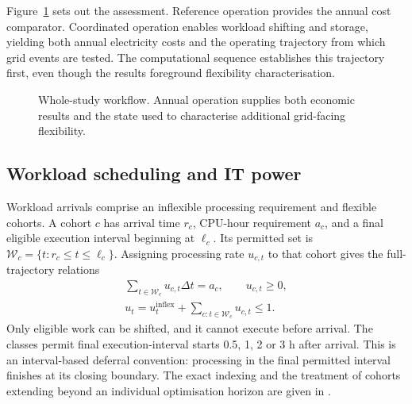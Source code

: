 Figure~\ref{fig:workflow} sets out the assessment. Reference operation provides the annual cost comparator. Coordinated operation enables workload shifting and storage, yielding both annual electricity costs and the operating trajectory from which grid events are tested. The computational sequence establishes this trajectory first, even though the results foreground flexibility characterisation.
\begin{figure}[t]
\centering
{}
\caption{Whole-study workflow. Annual operation supplies both economic results and the state used to characterise additional grid-facing flexibility.}
\label{fig:workflow}
\end{figure}

\subsection{Workload scheduling and IT power}
Workload arrivals comprise an inflexible processing requirement and flexible cohorts. A cohort $c$ has arrival time $r_c$, CPU-hour requirement $a_c$, and a final eligible execution interval beginning at $\ell_c$. Its permitted set is $\mathcal W_c=\{t:r_c\leq t\leq\ell_c\}$. Assigning processing rate $u_{c,t}$ to that cohort gives the full-trajectory relations
\begin{equation}
\begin{gathered}
\sum_{t\in\mathcal W_c}u_{c,t}\Delta t=a_c,\qquad u_{c,t}\geq0,\\
u_t=u_t^{\mathrm{inflex}}+\sum_{c:t\in\mathcal W_c}u_{c,t}\leq1.
\end{gathered}
\label{eq:work}
\end{equation}
Only eligible work can be shifted, and it cannot execute before arrival. The classes permit final execution-interval starts 0.5, 1, 2 or 3 h after arrival. This is an interval-based deferral convention: processing in the final permitted interval finishes at its closing boundary. The exact indexing and the treatment of cohorts extending beyond an individual optimisation horizon are given in .

